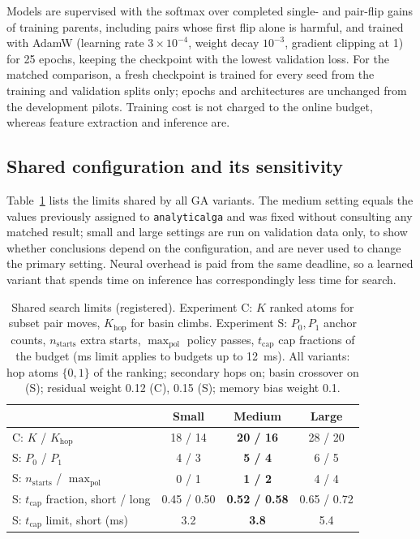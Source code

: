 \documentclass[conference]{IEEEtran}
\newcommand{\mth}[1]{\begingroup\renewcommand{\_}{\textunderscore\allowbreak}\texttt{#1}\endgroup}
\begin{document}
Models are supervised with the softmax over completed single- and pair-flip gains of training parents, including pairs whose first flip alone is harmful, and trained with AdamW (learning rate $3\times10^{-4}$, weight decay $10^{-3}$, gradient clipping at 1) for 25 epochs, keeping the checkpoint with the lowest validation loss. For the matched comparison, a fresh checkpoint is trained for every seed from the training and validation splits only; epochs and architectures are unchanged from the development pilots. Training cost is not charged to the online budget, whereas feature extraction and inference are.

\subsection{Shared configuration and its sensitivity}
Table~\ref{tab:config} lists the limits shared by all GA variants. The medium setting equals the values previously assigned to \mth{analytical\_ga} and was fixed without consulting any matched result; small and large settings are run on validation data only, to show whether conclusions depend on the configuration, and are never used to change the primary setting. Neural overhead is paid from the same deadline, so a learned variant that spends time on inference has correspondingly less time for search.

\begin{table}[t]
\caption{Shared search limits (registered). Experiment C: $K$ ranked atoms for subset pair moves, $K_{\mathrm{hop}}$ for basin climbs. Experiment S: $P_0,P_1$ anchor counts, $n_{\mathrm{starts}}$ extra starts, $\max_{\mathrm{pol}}$ policy passes, $t_{\mathrm{cap}}$ cap fractions of the budget (ms limit applies to budgets up to 12~ms). All variants: hop atoms $\{0,1\}$ of the ranking; secondary hops on; basin crossover on (S); residual weight 0.12 (C), 0.15 (S); memory bias weight 0.1.}\label{tab:config}
\centering\footnotesize
\begin{tabular}{@{}lccc@{}}
\toprule
 & Small & \textbf{Medium} & Large\\
\midrule
C: $K$ / $K_{\mathrm{hop}}$ & 18 / 14 & \textbf{20 / 16} & 28 / 20\\
S: $P_0$ / $P_1$ & 4 / 3 & \textbf{5 / 4} & 6 / 5\\
S: $n_{\mathrm{starts}}$ / $\max_{\mathrm{pol}}$ & 0 / 1 & \textbf{1 / 2} & 4 / 4\\
S: $t_{\mathrm{cap}}$ fraction, short / long & 0.45 / 0.50 & \textbf{0.52 / 0.58} & 0.65 / 0.72\\
S: $t_{\mathrm{cap}}$ limit, short (ms) & 3.2 & \textbf{3.8} & 5.4\\
\bottomrule
\end{tabular}
\end{table}
\end{document}
